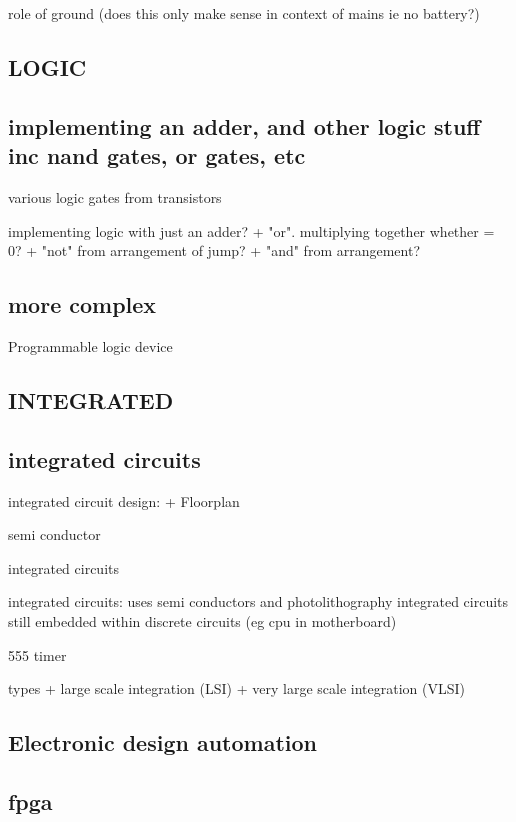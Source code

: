 role of ground (does this only make sense in context of mains ie no battery?)

\subsection{LOGIC}

\subsection{implementing an adder, and other logic stuff inc nand gates, or gates, etc}

various logic gates from transistors

implementing logic with just an adder?
+ "or". multiplying together whether = 0?
+ "not" from arrangement of jump?
+ "and" from arrangement?

\subsection{more complex}


Programmable logic device

\subsection{INTEGRATED}

\subsection{integrated circuits}

integrated circuit design:
+ Floorplan

semi conductor

integrated circuits

integrated circuits: uses semi conductors and photolithography
integrated circuits still embedded within discrete circuits (eg cpu in motherboard)

555 timer

types
+ large scale integration (LSI)
+ very large scale integration (VLSI)

\subsection{Electronic design automation}


\subsection{fpga}

